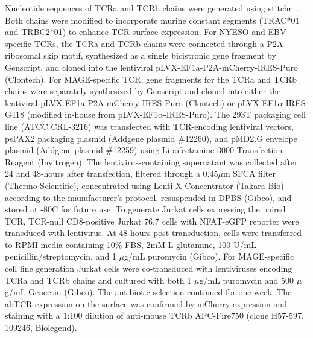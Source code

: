 Nucleotide sequences of TCRa and TCRb chains
were generated using stitchr~\cite{Heather2022-nr}. Both chains were modified to incorporate murine
constant segments (TRAC*01 and TRBC2*01) to enhance TCR surface expression. For NYESO and
EBV-specific TCRs, the TCRa and TCRb chains were connected through a P2A ribosomal skip motif,
synthesized as a single bicistronic gene fragment by Genscript, and cloned into the lentiviral
pLVX-EF1a-P2A-mCherry-IRES-Puro (Clontech). For MAGE-specific TCR, gene fragments for the TCRa and
TCRb chains were separately synthesized by Genscript and cloned into either the lentiviral
pLVX-EF1a-P2A-mCherry-IRES-Puro (Clontech) or pLVX-EF1$\alpha$-IRES-G418 (modified in-house from
pLVX-EF1$\alpha$-IRES-Puro). The 293T packaging cell line (ATCC CRL-3216) was transfected with
TCR-encoding lentiviral vectors, psPAX2 packaging plasmid (Addgene plasmid \#12260), and pMD2.G
envelope plasmid (Addgene plasmid \#12259) using Lipofectamine 3000 Transfection Reagent
(Invitrogen). The lentivirus-containing supernatant was collected after 24 and 48-hours after
transfection, filtered through a 0.45$\mu$m SFCA filter (Thermo Scientific), concentrated using
Lenti-X Concentrator (Takara Bio) according to the manufacturer’s protocol, resuspended in DPBS
(Gibco), and stored at -80C for future use. To generate Jurkat cells expressing the paired TCR,
TCR-null CD8-positive Jurkat 76.7 cells with NFAT-eGFP reporter were transduced with lentivirus. At
48 hours post-transduction, cells were transferred to RPMI media containing 10\% FBS, 2mM
L-glutamine, 100 U/mL penicillin/streptomycin, and 1 $\mu$g/mL puromycin (Gibco). For MAGE-specific
cell line generation Jurkat cells were co-transduced with lentiviruses encoding TCRa and TCRb chains
and cultured with both 1 $\mu$g/mL puromycin and 500 $\mu$g/mL Genectin (Gibco). The antibiotic
selection continued for one week. The abTCR expression on the surface was confirmed by mCherry
expression and staining with a 1:100 dilution of anti-mouse TCRb APC-Fire750 (clone H57-597, 109246,
Biolegend).\\

